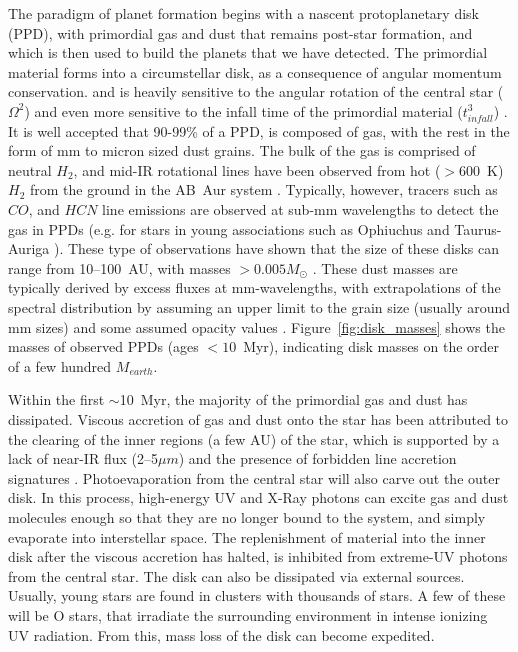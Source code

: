     The paradigm of planet formation begins with a nascent protoplanetary disk (PPD), with primordial gas and dust that remains post-star formation, and which is then used to build the planets that we have detected. The primordial material forms into a circumstellar disk, as a consequence of angular momentum conservation. and is heavily sensitive to the angular rotation of the central star ($\Omega^2$) and even more sensitive to the infall time of the primordial material ($t_{infall}^3$) \citep{Terebey1984}. It is well accepted that 90-99\% of a PPD, is composed of gas, with the rest in the form of mm to micron sized dust grains. The bulk of the gas is comprised of neutral $H_2$, and mid-IR rotational lines have been observed from hot ($>600$~K) $H_2$ from the ground in the AB~Aur system \citep{Bitner2007}. Typically, however, tracers such as $CO$, and $HCN$ line emissions are observed at sub-mm wavelengths to detect the gas in PPDs (e.g. for stars in young associations such as Ophiuchus \citep{Andre1994} and Taurus-Auriga \citep{Beckwith1990}). These type of observations have shown that the size of these disks can range from 10--100~AU, with masses $>0.005M_\odot$ \citep{Osterloh1995}. These dust masses are typically derived by excess fluxes at mm-wavelengths, with extrapolations of the spectral distribution by assuming an upper limit to the grain size (usually around mm sizes) and some assumed opacity values \citep{Beckwith1990}. Figure~\ref{fig:disk_masses} shows the masses of observed PPDs (ages $<10$~Myr), indicating disk masses on the order of a few hundred $M_{earth}$. 
    
    
    Within the first $\sim$10~Myr, the majority of the primordial gas and dust has dissipated. Viscous accretion of gas and dust onto the star has been attributed to the clearing of the inner regions (a few AU) of the star, which is supported by a lack of near-IR flux (2--5$\mu m$) and the presence of forbidden line accretion signatures \citep[(e.g., O~I, S~II)][]{Hartigan1995}. Photoevaporation from the central star will also carve out the outer disk. In this process, high-energy UV and X-Ray photons can excite gas and dust molecules enough so that they are no longer bound to the system, and simply evaporate into interstellar space. The replenishment of material into the inner disk after the viscous accretion has halted, is inhibited from extreme-UV photons from the central star. The disk can also be dissipated via external sources. Usually, young stars are found in clusters with thousands of stars. A few of these will be O stars, that irradiate the surrounding environment in intense ionizing UV radiation. From this, mass loss of the disk can become expedited. 
    
